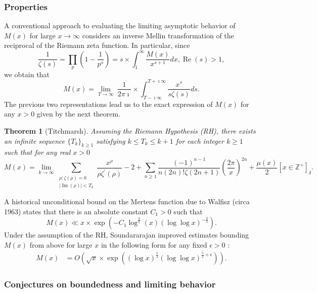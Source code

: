 \documentclass[11pt,reqno,a4letter]{article}
\numberwithin{figure}{section}
\numberwithin{table}{section}
\newcommand{\Iverson}[1]{\ensuremath{\left[#1\right]_{\delta}}}
\theoremstyle{plain}
\newtheorem{theorem}{Theorem}
\numberwithin{theorem}{section}
\theoremstyle{definition}
\renewcommand{\Re}{\operatorname{Re}}
\renewcommand{\Im}{\operatorname{Im}}
\begin{document}
\subsubsection{Properties} 
\label{subSection_Intro_Mx_properties} 

A conventional approach to evaluating the limiting asymptotic 
behavior of $M(x)$ for large $x \rightarrow \infty$ considers an 
inverse Mellin transformation of the reciprocal of the Riemann zeta function. 
In particular, since 
\[
\frac{1}{\zeta(s)} = \prod_{p} \left(1 - \frac{1}{p^s}\right) = 
     s \times \int_1^{\infty} \frac{M(x)}{x^{s+1}} dx, \Re(s) > 1, 
\]
we obtain that 
\[
M(x) = \lim_{T \rightarrow \infty}\ \frac{1}{2\pi\imath} \times \int_{T-\imath\infty}^{T+\imath\infty} 
     \frac{x^s}{s \zeta(s)} ds. 
\] 
The previous two representations lead us to the 
exact expression of $M(x)$ for any $x > 0$ 
given by the next theorem. 
\nocite{TITCHMARSH} 

\begin{theorem}[Titchmarsh] 
\label{theorem_MxMellinTransformInvFormula} 
Assuming the Riemann Hypothesis (RH), there exists an infinite sequence 
$\{T_k\}_{k \geq 1}$ satisfying $k \leq T_k \leq k+1$ for each integer $k \geq 1$ 
such that for any real $x > 0$ 
\[
M(x) = \lim_{k \rightarrow \infty} 
     \sum_{\substack{\rho: \zeta(\rho) = 0 \\ |\Im(\rho)| < T_k}} 
     \frac{x^{\rho}}{\rho \zeta^{\prime}(\rho)} - 2 + 
     \sum_{n \geq 1} \frac{(-1)^{n-1}}{n (2n)! \zeta(2n+1)} 
     \left(\frac{2\pi}{x}\right)^{2n} + 
     \frac{\mu(x)}{2} \Iverson{x \in \mathbb{Z}^{+}}. 
\] 
\end{theorem} 

A historical unconditional bound on the Mertens function due to Walfisz (circa 1963) 
states that there is an absolute constant $C_1 > 0$ such that 
$$M(x) \ll x \times \exp\left(-C_1 \log^{\frac{3}{5}}(x) 
  (\log\log x)^{-\frac{3}{5}}\right).$$ 
Under the assumption of the RH, Soundararajan improved estimates 
bounding $M(x)$ from above for large $x$ in the following form for any fixed 
$\epsilon > 0$ \cite{SOUND-MERTENS-ANNALS}: 
\begin{align*} 
M(x) & = O\left(\sqrt{x} \times \exp\left( 
     (\log x)^{\frac{1}{2}} (\log\log x)^{\frac{5}{2}+\epsilon}\right)\right). 
\end{align*} 

\subsubsection{Conjectures on boundedness and limiting behavior} 
\end{document}
